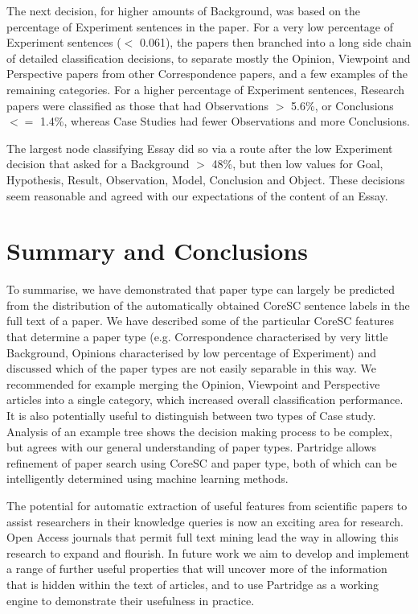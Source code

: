 \documentclass{svmult}
\begin{document}
The next decision, for higher amounts of Background, was based on the
percentage of Experiment sentences in the paper. For a very low
percentage of Experiment sentences ($<$ 0.061), the papers then
branched into a long side chain of detailed classification decisions,
to separate mostly the Opinion, Viewpoint and Perspective papers from
other Correspondence papers, and a few examples of the remaining
categories. For a higher percentage of Experiment sentences, Research
papers were classified as those that had Observations $>$ 5.6\%, or
Conclusions $<=$ 1.4\%, whereas Case Studies had fewer Observations
and more Conclusions.

The largest node classifying Essay did so via a route after the low
Experiment decision that asked for a Background $>$ 48\%, but then low
values for Goal, Hypothesis, Result, Observation, Model, Conclusion
and Object. These decisions seem reasonable and agreed with our
expectations of the content of an Essay.

\vspace{-15pt}
\section{Summary and Conclusions}
\label{sec:4}
\vspace{-15pt}
To summarise, we have demonstrated that paper type can largely be predicted
from the distribution of the automatically obtained CoreSC sentence labels in
the full text of a paper. We have described some of the particular CoreSC
features that determine a paper type (e.g. Correspondence characterised by very
little Background, Opinions characterised by low percentage of Experiment) and
discussed which of the paper types are not easily separable in this way. We
recommended for example merging the Opinion, Viewpoint and Perspective articles
into a single category, which increased overall classification performance. It
is also potentially useful to distinguish between two types of Case study.
Analysis of an example tree shows the decision making process to be complex,
but agrees with our general understanding of paper types. Partridge allows refinement of paper search using CoreSC and paper type, both of which
can be intelligently determined using machine learning methods.



The potential for automatic extraction of useful features from
scientific papers to assist researchers in their knowledge queries is
now an exciting area for research. Open Access journals that permit
full text mining lead the way in allowing this research to expand and
flourish. In future work we aim to develop and implement a range of
further useful properties that will uncover more of the information
that is hidden within the text of articles, and to use Partridge as a
working engine to demonstrate their usefulness in practice.
\end{document}
